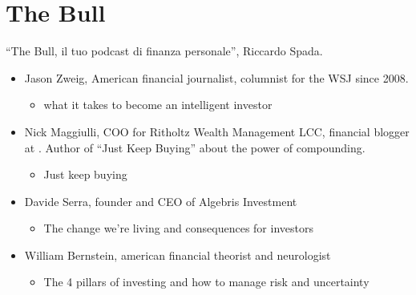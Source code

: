 \documentclass[letterpaper,10pt,english]{jupyterBook}
\begin{document}
\chapter{The Bull}
\label{\detokenize{ch/people/the_bull_guests:the-bull}}\label{\detokenize{ch/people/the_bull_guests:fin-edu-resources-the-bull}}\label{\detokenize{ch/people/the_bull_guests::doc}}
\sphinxAtStartPar
“The Bull, il tuo podcast di finanza personale”, Riccardo Spada. 
\begin{itemize}
\item {} 
\sphinxAtStartPar
Jason Zweig, American financial journalist, columnist for the WSJ since 2008. 
\begin{itemize}
\item {} 
\sphinxAtStartPar
{} what it takes to become an intelligent investor

\end{itemize}

\item {} 
\sphinxAtStartPar
Nick Maggiulli, COO for Ritholtz Wealth Management LCC, financial blogger at . Author of “Just Keep Buying” about the power of compounding.
\begin{itemize}
\item {} 
\sphinxAtStartPar
{} Just keep buying

\end{itemize}

\item {} 
\sphinxAtStartPar
Davide Serra, founder and CEO of Algebris Investment
\begin{itemize}
\item {} 
\sphinxAtStartPar
{} The change we’re living and consequences for investors

\end{itemize}

\item {} 
\sphinxAtStartPar
William Bernstein, american financial theorist and neurologist
\begin{itemize}
\item {} 
\sphinxAtStartPar
{} The 4 pillars of investing and how to manage risk and uncertainty


\end{itemize}
\end{itemize}
\end{document}

